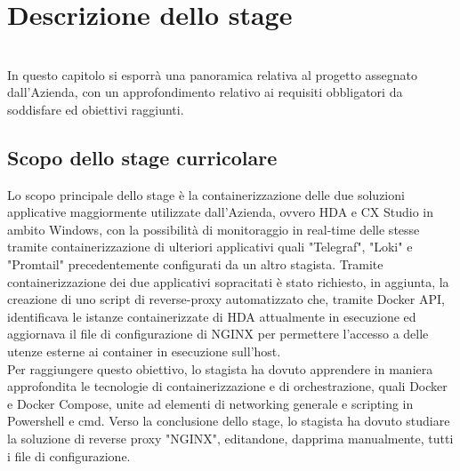 
\chapter{Descrizione dello stage}
\label{cap:descrizione-stage}

\\
In questo capitolo si esporrà una panoramica relativa al progetto assegnato dall'Azienda, con un approfondimento relativo ai requisiti obbligatori da soddisfare ed obiettivi raggiunti. 

\section{Scopo dello stage curricolare}
Lo scopo principale dello stage è la containerizzazione delle due soluzioni applicative maggiormente utilizzate dall'Azienda, ovvero \gls{HDA} e \gls{CX Studio} in ambito Windows, con la possibilità di monitoraggio in real-time delle stesse tramite containerizzazione di ulteriori applicativi quali "Telegraf", "Loki" e "Promtail" precedentemente configurati da un altro stagista.
Tramite containerizzazione dei due applicativi sopracitati è stato richiesto, in aggiunta, la creazione di uno script di reverse-proxy automatizzato che, tramite Docker API, identificava le istanze containerizzate di HDA attualmente in esecuzione ed aggiornava il file di configurazione di NGINX per permettere l'accesso a delle utenze esterne ai container in esecuzione sull'host.\\
Per raggiungere questo obiettivo, lo stagista ha dovuto apprendere in maniera approfondita le tecnologie di containerizzazione e di orchestrazione, quali \gls{Docker} e \gls{Docker Compose}, unite ad elementi di networking generale e scripting in Powershell e cmd. Verso la conclusione dello stage, lo stagista ha dovuto studiare la soluzione di reverse proxy "NGINX", editandone, dapprima manualmente, tutti i file di configurazione.


